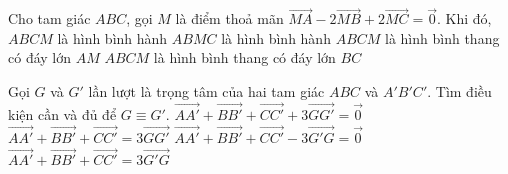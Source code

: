 \begin{ex}%
	Cho tam giác $ABC$, gọi $M$ là điểm thoả mãn $\overrightarrow{MA}-2\overrightarrow{MB}+2\overrightarrow{MC}=\overrightarrow{0}$. Khi đó,
	\choice
	{$ABCM$ là hình bình hành}
	{$ABMC$ là hình bình hành}
	{\True $ABCM$ là hình bình thang có đáy lớn $AM$}
	{$ABCM$ là hình bình thang có đáy lớn $BC$}
\end{ex}

\begin{ex}%
	Gọi $G$ và $G'$ lần lượt là trọng tâm của hai tam giác $ABC$ và $A'B'C'$. Tìm điều kiện cần và đủ để $G \equiv G'$.
	\choice
	{$\overrightarrow{AA'}+\overrightarrow{BB'}+\overrightarrow{CC'}+3\overrightarrow{GG'}=\overrightarrow{0}$}
	{$\overrightarrow{AA'}+\overrightarrow{BB'}+\overrightarrow{CC'}=3\overrightarrow{GG'}$}
	{$\overrightarrow{AA'}+\overrightarrow{BB'}+\overrightarrow{CC'}-3\overrightarrow{G'G}=\overrightarrow{0}$}
	{\True  $\overrightarrow{AA'}+\overrightarrow{BB'}+\overrightarrow{CC'}=3\overrightarrow{G'G}$}
\end{ex}

